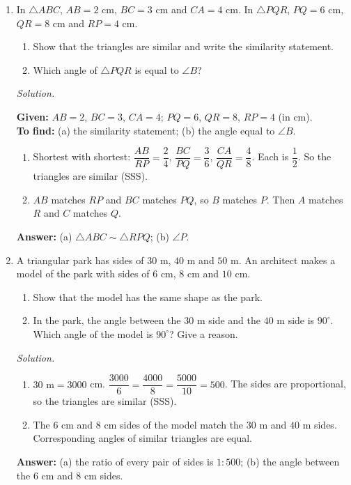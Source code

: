 \documentclass[11pt,a4paper]{article}
\theoremstyle{branddef}
\newcommand{\tr}{\triangle}
\newenvironment{exercise}[1]
  {\par\medskip\Needspace{7\baselineskip}\noindent{\large\bfseries Exercise #1}
   \par\smallskip
   \begin{enumerate}[leftmargin=*,itemsep=4pt]}
  {\end{enumerate}}
\newenvironment{solution}
  {\par\smallskip\begingroup\small\linespread{1.15}\selectfont\color{muted}\noindent\textit{Solution.}\par}
  {\par\endgroup\smallskip}
\newenvironment{steps}{\begin{enumerate}[label=\arabic*.,leftmargin=1.5em,itemsep=0pt,topsep=2pt]}{\end{enumerate}}
\begin{document}
\begin{exercise}{3B}
\item In $\tr ABC$, $AB=2$ cm, $BC=3$ cm and $CA=4$ cm. In $\tr PQR$, $PQ=6$ cm, $QR=8$ cm and $RP=4$ cm.
\begin{enumerate}[label=(\alph*),itemsep=1pt]
  \item Show that the triangles are similar and write the similarity statement.
  \item Which angle of $\tr PQR$ is equal to $\angle B$?
\end{enumerate}
\begin{solution}
\textbf{Given:} $AB=2$, $BC=3$, $CA=4$; $PQ=6$, $QR=8$, $RP=4$ (in cm).\\
\textbf{To find:} (a) the similarity statement; (b) the angle equal to $\angle B$.
\begin{steps}
  \item Shortest with shortest: $\dfrac{AB}{RP}=\dfrac24$, $\dfrac{BC}{PQ}=\dfrac36$, $\dfrac{CA}{QR}=\dfrac48$. Each is $\dfrac12$. So the triangles are similar (SSS).
  \item $AB$ matches $RP$ and $BC$ matches $PQ$, so $B$ matches $P$. Then $A$ matches $R$ and $C$ matches $Q$.
\end{steps}
\textbf{Answer:} (a) $\tr ABC\sim\tr RPQ$; (b) $\angle P$.
\end{solution}

\item A triangular park has sides of $30$ m, $40$ m and $50$ m. An architect makes a model of the park with sides of $6$ cm, $8$ cm and $10$ cm.
\begin{enumerate}[label=(\alph*),itemsep=1pt]
  \item Show that the model has the same shape as the park.
  \item In the park, the angle between the $30$ m side and the $40$ m side is $90^\circ$. Which angle of the model is $90^\circ$? Give a reason.
\end{enumerate}
\begin{solution}
\begin{steps}
  \item[(a)] $30\text{ m}=3000$ cm. $\dfrac{3000}{6}=\dfrac{4000}{8}=\dfrac{5000}{10}=500$. The sides are proportional, so the triangles are similar (SSS).
  \item[(b)] The $6$ cm and $8$ cm sides of the model match the $30$ m and $40$ m sides. Corresponding angles of similar triangles are equal.
\end{steps}
\textbf{Answer:} (a) the ratio of every pair of sides is $1:500$; (b) the angle between the $6$ cm and $8$ cm sides.
\end{solution}
\end{exercise}
\end{document}
